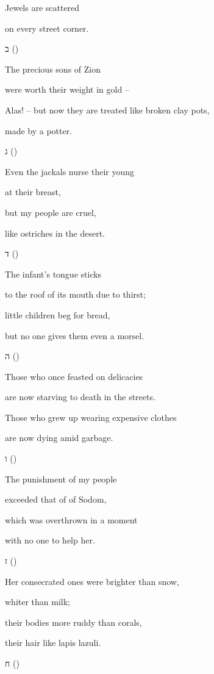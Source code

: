 {\par }{\Q Jewels
are scattered
\par }{\Q on every
street
corner.
\par }{\SH ב ({})
\par }{\Q {}The precious sons of Zion
\par }{\Q were worth their weight in gold –
\par }{\Q Alas! – but now they are treated like broken clay pots,
\par }{\Q made by a potter.
\par }{\SH ג ({})
\par }{\Q {}Even the jackals nurse their young
\par }{\Q at their breast,
\par }{\Q but my people are cruel,
\par }{\Q like ostriches in the desert.
\par }{\SH ד ({})
\par }{\Q {}The infant’s tongue sticks
\par }{\Q to the roof of its mouth due to thirst;
\par }{\Q little children beg for bread,
\par }{\Q but no one gives them even a morsel.
\par }{\SH ה ({})
\par }{\Q {}Those who once feasted on delicacies
\par }{\Q are now starving to death in the streets.
\par }{\Q Those who grew up wearing expensive clothes
\par }{\Q are now dying amid garbage.
\par }{\SH ו ({})
\par }{\Q {}The punishment of my people
\par }{\Q exceeded that of of Sodom,
\par }{\Q which was overthrown in a moment
\par }{\Q with no one to help her.
\par }{\SH ז ({})
\par }{\Q {}Her consecrated ones were brighter than snow,
\par }{\Q whiter than milk;
\par }{\Q their bodies more ruddy than corals,
\par }{\Q their hair like lapis lazuli.
\par }{\SH ח ({})
}

